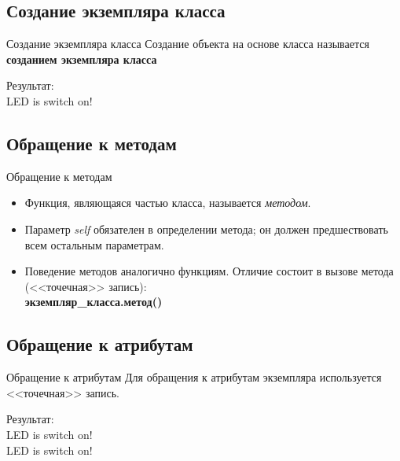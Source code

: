 \documentclass[12pt]{beamer}
\begin{document}
\subsection{Создание экземпляра класса}
\begin{frame}{Создание экземпляра класса}
Создание объекта на основе класса называется \textbf{созданием экземпляра класса}
\vspace{0.5cm}

\vspace{0.5cm}
Результат: \\
LED is switch on!\\
\end{frame}

\subsection{Обращение к методам}
\begin{frame}{Обращение к методам}
\begin{itemize}
\item Функция, являющаяся частью класса, называется \emph{методом}.
\item Параметр \emph{self} обязателен в определении метода; он должен предшествовать всем остальным параметрам.
\item Поведение методов аналогично функциям. Отличие состоит в вызове метода (<<точечная>> запись):
\\
\vspace{0.5cm}
\textbf{экземпляр\_класса.метод()} \\
\vspace{0.5cm}

\vspace{0.5cm}
\end{itemize}
\end{frame}


\subsection{Обращение к атрибутам}
\begin{frame}{Обращение к атрибутам}
Для обращения к атрибутам экземпляра используется <<точечная>> запись.
\vspace{0.5cm}

\vspace{0.5cm}
Результат: \\
LED is switch on!\\
LED is switch on!\\
\end{frame}
\end{document}

